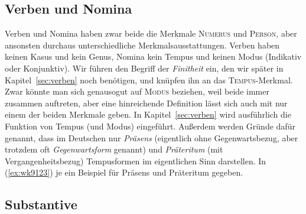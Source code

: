 
\subsection{Verben und Nomina}

\label{sec:verbennominawortklassen}


Verben und Nomina haben zwar beide die Merkmale \textsc{Numerus} und \textsc{Person}, aber ansonsten durchaus unterschiedliche Merkmalsausstattungen.
Verben haben keinen Kasus und kein Genus, Nomina kein Tempus und keinen Modus (Indikativ oder Konjunktiv).
Wir führen den Begriff der \textit{Finitheit} ein, den wir später in Kapitel~\ref{sec:verben} noch benötigen, und knüpfen ihn an das \textsc{Tempus}-Merkmal.
Zwar könnte man sich genausogut auf \textsc{Modus} beziehen, weil beide immer zusammen auftreten, aber eine hinreichende Definition lässt sich auch mit nur einem der beiden Merkmale geben.
In Kapitel~\ref{sec:verben} wird ausführlich die Funktion von Tempus (und Modus) eingeführt.
Außerdem werden Gründe dafür genannt, dass im Deutschen nur \textit{Präsens} (eigentlich ohne Gegenwartsbezug, aber trotzdem oft \textit{Gegenwartsform} genannt) und \textit{Präteritum} (mit Vergangenheitsbezug) Tempusformen im eigentlichen Sinn darstellen.
In (\ref{ex:wk9123}) je ein Beispiel für Präsens und Präteritum gegeben.

\begin{exe}
  \ex\label{ex:wk9123}
  \begin{xlist}
  \end{xlist}
\end{exe}



\subsection{Substantive}

